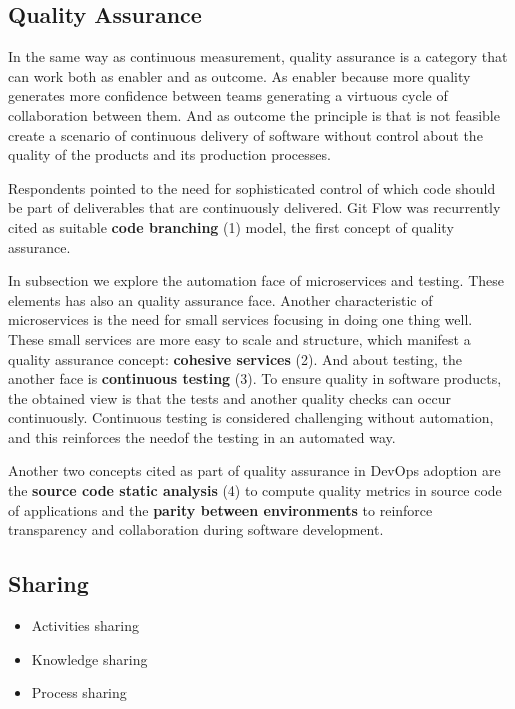 \subsection{Quality Assurance}

In the same way as continuous measurement, quality assurance is a category that
can work both as enabler and as outcome. As enabler because more quality
generates more confidence between teams generating a virtuous cycle of
collaboration between them. And as outcome the principle is that is not
feasible create a scenario of continuous delivery of software without control
about the quality of the products and its production processes.

Respondents pointed to the need for sophisticated control of which code should
be part of deliverables that are continuously delivered. Git Flow was
recurrently cited as suitable \textbf{code branching} (1) model, the first
concept of quality assurance.

In subsection \label{ssec:automation} we explore the automation face of
microservices and testing. These elements has also an quality assurance face.
Another characteristic of microservices is the need for small services focusing
in doing one thing well. These small services are more easy to scale and
structure, which manifest a quality assurance concept: \textbf{cohesive
services} (2). And about testing, the another face is \textbf{continuous
testing} (3). To ensure quality in software products, the obtained view is that
the tests and another quality checks can occur continuously. Continuous testing
is considered challenging without automation, and this reinforces the needof
the testing in an automated way.

Another two concepts cited as part of quality assurance in DevOps adoption are
the \textbf{source code static analysis} (4) to compute quality metrics in
source code of applications and the \textbf{parity between environments} to
reinforce transparency and collaboration during software development.

\subsection{Sharing}
\begin{itemize}
\item Activities sharing
\item Knowledge sharing
\item Process sharing
\end{itemize}

